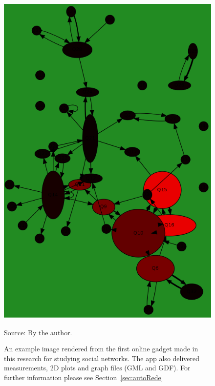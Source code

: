\begin{apendicesenv}
\begin{figure}[h!]
\begin{center}
\includegraphics[scale=.25]{figs/autoRede_}
\caption{An example image rendered from the first online gadget made in this research for studying social networks.
	The app also delivered measurements, 2D plots and graph files (GML and GDF).
	For further information please see Section~\ref{sec:autoRede}}
\label{fig:autoRede}
\begin{flushleft}\footnotesize
Source: By the author.\
\end{flushleft}
\end{center}
\end{figure}


\end{apendicesenv}
